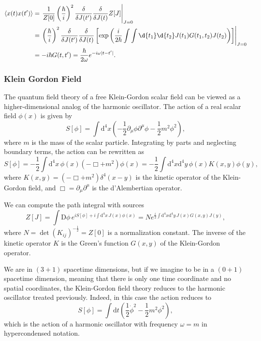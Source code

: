 \[
    \begin{aligned}
        \langle x(t)x(t^{\prime}) \rangle & = \left. \frac{1}{Z[0]} \left(\frac{\hbar}{i}\right)^2 \frac{\delta}{\delta J(t^{\prime})} \frac{\delta}{\delta J(t)} Z[J] \right|_{J=0}                                                                                 \\
                                          & = \left. \left(\frac{\hbar}{i}\right)^2 \frac{\delta}{\delta J(t^{\prime})} \frac{\delta}{\delta J(t)} \left[ \exp\left( \frac{i}{2\hbar} \int\int \d{t_1} \d{t_2} J(t_1) G(t_1,t_2)J(t_2) \right) \right] \right|_{J=0} \\
                                          & = -i \hbar G(t,t^{\prime}) = \frac{\hbar}{2\omega} e^{-i\omega \vert t-t^{\prime} \vert}.
    \end{aligned}
\]

\subsubsection{Klein Gordon Field}

The quantum field theory of a free Klein-Gordon scalar field can be viewed as a higher-dimensional analog of the harmonic oscillator. The action of a real scalar field \(\phi(x)\) is given by
\[
    S[\phi] = \int \mathrm{d}^4 x \left( -\frac{1}{2} \partial_\mu \phi \partial^\mu \phi - \frac{1}{2} m^2 \phi^2 \right),
\]
where \(m\) is the mass of the scalar particle. Integrating by parts and neglecting boundary terms, the action can be rewritten as
\[
    S[\phi] = -\frac{1}{2} \int \mathrm{d}^4 x \, \phi(x) \left( -\Box + m^2 \right) \phi(x) = -\frac{1}{2} \int \mathrm{d}^4 x \mathrm{d}^4 y \, \phi(x) K(x,y) \phi(y),
\]
where \(K(x,y) = \left( - \Box + m^2 \right) \delta^4(x-y)\) is the kinetic operator of the Klein-Gordon field, and \(\Box = \partial_\mu \partial^\mu\) is the d'Alembertian operator.

We can compute the path integral with sources
\[
    Z[J] = \int \mathrm{D} \phi \, e^{i S[\phi] + i \int \mathrm{d}^4 x \, J(x) \phi(x)} = N e^{\frac{i}{2} \int \mathrm{d}^4 x \mathrm{d}^4 y \, J(x) G(x,y) J(y)},
\]
where \(N = \det(K_{ij})^{-\frac{1}{2}} = Z[0]\) is a normalization constant. The inverse of the kinetic operator \(K\) is the Green's function \(G(x,y)\) of the Klein-Gordon operator.

We are in \((3+1)\) spacetime dimensions, but if we imagine to be in a \((0+1)\) spacetime dimension, meaning that there is only one time coordinate and no spatial coordinates, the Klein-Gordon field theory reduces to the harmonic oscillator treated previously. Indeed, in this case the action reduces to
\[
    S[\phi] = \int \mathrm{d}t \left( \frac{1}{2} \dot{\phi}^2 - \frac{1}{2} m^2 \phi^2 \right),
\]
which is the action of a harmonic oscillator with frequency \(\omega = m\) in hypercondensed notation.

